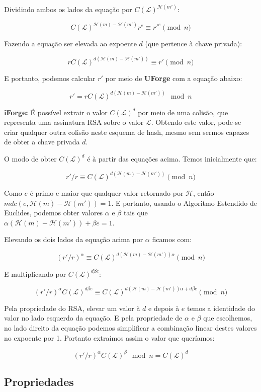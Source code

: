 \documentclass[a4paper]{article}
\begin{document}
Dividindo ambos os lados da equação por $C(\mathcal{L})^{\mathcal{H}(m')}$:

$$
C(\mathcal{L})^{\mathcal{H}(m)-\mathcal{H}(m')}r^e \equiv r'^e \pmod n
$$

Fazendo a equação ser elevada ao expoente $d$ (que pertence à chave
privada):

$$
rC(\mathcal{L})^{d(\mathcal{H}(m)-\mathcal{H}(m'))} \equiv r' \pmod n
$$

E portanto, podemos calcular $r'$ por meio de \textbf{UForge} com a
equação abaixo:

$$
r' = rC(\mathcal{L})^{d(\mathcal{H}(m)-\mathcal{H}(m'))} \mod n
$$

\textbf{iForge:} É possível extrair o valor $C(\mathcal{L})^d$ por
meio de uma colisão, que representa uma assinatura RSA sobre o valor
$\mathcal{L}$. Obtendo este valor, pode-se criar qualquer outra
colisão neste esquema de hash, mesmo sem sermos capazes de obter a
chave privada $d$.

O modo de obter $C(\mathcal{L})^d$ é à partir das equações
acima. Temos inicialmente que:

$$
r'/r \equiv C(\mathcal{L})^{d(\mathcal{H}(m)-\mathcal{H}(m'))} \pmod n
$$

Como $e$ é primo e maior que qualquer valor retornado por
$\mathcal{H}$, então $mdc(e, \mathcal{H}(m)-\mathcal{H}(m')) = 1$. E
portanto, usando o Algoritmo Estendido de Euclides, podemos obter
valores $\alpha$ e $\beta$ tais que
$\alpha(\mathcal{H}(m)-\mathcal{H}(m'))+\beta e = 1$.

Elevando os dois lados da equação acima por $\alpha$ ficamos com:

$$
(r'/r)^\alpha \equiv C(\mathcal{L})^{d(\mathcal{H}(m)-\mathcal{H}(m'))\alpha} \pmod n
$$

E multiplicando por $C(\mathcal{L})^{d\beta e}$:

$$
(r'/r)^\alpha C(\mathcal{L})^{d\beta e} \equiv C(\mathcal{L})^{d(\mathcal{H}(m)-\mathcal{H}(m'))\alpha + d\beta e} \pmod n
$$

Pela propriedade do RSA, elevar um valor à $d$ e depois à $e$ temos a
identidade do valor no lado esquerdo da equação. E pela propriedade de
$\alpha$ e $\beta$ que escolhemos, no lado direito da equação podemos
simplificar a combinação linear destes valores no expoente por
1. Portanto extraímos assim o valor que queríamos:

$$
(r'/r)^\alpha C(\mathcal{L})^{\beta} \mod n= C(\mathcal{L})^d
$$

\subsection{Propriedades}
\end{document}

